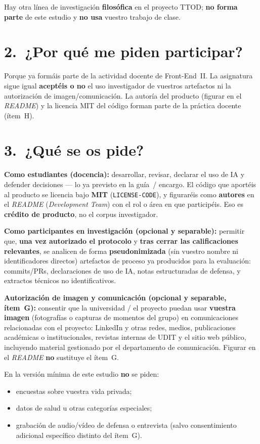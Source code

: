 \documentclass[11pt,a4paper]{scrartcl}
\begin{document}
Hay otra línea de investigación \textbf{filosófica} en el proyecto TTOD;
\textbf{no forma parte} de este estudio y \textbf{no usa} vuestro trabajo
de clase.

\section*{2.\ ¿Por qué me piden participar?}

Porque ya formáis parte de la actividad docente de Front-End~II.
La asignatura sigue igual \textbf{aceptéis o no} el uso investigador
de vuestros artefactos ni la autorización de imagen/comunicación.
La autoría del producto (figurar en el \emph{README}) y la licencia MIT del código
forman parte de la práctica docente (ítem~H).

\section*{3.\ ¿Qué se os pide?}

\textbf{Como estudiantes (docencia):} desarrollar, revisar, declarar el uso
de IA y defender decisiones --- lo ya previsto en la guía~/ encargo.
El código que aportéis al producto se licencia bajo \textbf{MIT}
(\texttt{LICENSE-CODE}), y figuraréis como \textbf{autores} en el \emph{README}
(\emph{Development Team}) con el rol o área en que participéis. Eso es
\textbf{crédito de producto}, no el corpus investigador.

\textbf{Como participantes en investigación (opcional y separable):}
permitir que, \textbf{una vez autorizado el protocolo} y
\textbf{tras cerrar las calificaciones relevantes}, se analicen de forma
\textbf{pseudonimizada} (sin vuestro nombre ni identificadores directos)
artefactos de proceso ya producidos para la evaluación: commits/PRs,
declaraciones de uso de IA, notas estructuradas de defensa, y extractos
técnicos no identificativos.

\textbf{Autorización de imagen y comunicación (opcional y separable, ítem~G):}
consentir que la universidad / el proyecto puedan usar \textbf{vuestra imagen}
(fotografías o capturas de momentos del grupo) en comunicaciones
relacionadas con el proyecto: LinkedIn y otras redes, medios, publicaciones
académicas o institucionales, revistas internas de UDIT y el sitio web público,
incluyendo material gestionado por el departamento de comunicación.
Figurar en el \emph{README} \textbf{no} sustituye el ítem~G.

En la versión mínima de este estudio \textbf{no} se piden:
\begin{itemize}
  \item encuestas sobre vuestra vida privada;
  \item datos de salud u otras categorías especiales;
  \item grabación de audio/vídeo de defensa o entrevista (salvo consentimiento
        adicional específico distinto del ítem~G).
\end{itemize}
\end{document}
